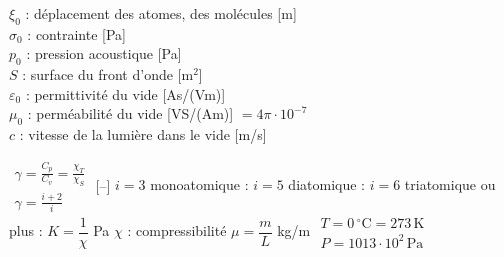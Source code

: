 \begin{minipage}{\columnwidth}
{\begin{minipage}[t]{0.49\columnwidth}
  $\xi_0$ : déplacement des atomes, des molécules [m] \\
  $\sigma_0$ : contrainte [Pa] \\
  $p_0$ : pression acoustique [Pa] \\
  $S$ : surface du front d'onde [m$^2$] \\
  $\varepsilon_0$ : permittivité du vide [As/(Vm)] \\
  $\mu_0$ : perméabilité du vide [VS/(Am)] $= 4\pi\cdot10^{-7}$ \\
  $c$ : vitesse de la lumière dans le vide [m/s]
\end{minipage}\par}
\end{minipage}\par\medskip

\begin{formules}[sans]
    {$\begin{gathered}
      \gamma = \frac{C_p}{C_v} = \frac{\chi_T}{\chi_S} \\
      \gamma = \frac{i+2}{i}
     \end{gathered}$}
    {[--]}
    {$i = 3$ monoatomique :  \newline
     $i = 5$ diatomique :  \newline
     $i = 6$ triatomique ou plus : }
    {$K = \dfrac{1}{\chi}$}
    {Pa}
    {$\chi$ : compressibilité}
    {$\mu = \dfrac{m}{L}$}
    {kg/m}
    {}
    {$\begin{gathered}
      T = 0\,^\circ\text{C} = 273\,\text{K} \\
      P = 1013\cdot10^2\,\text{Pa}
     \end{gathered}$}
    {}
    {}
\end{formules}


